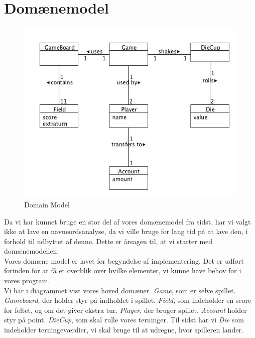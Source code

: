 \section{Domænemodel}
\begin{figure}[ht]
\centering
\includegraphics[scale=0.5]{DomainModelDieGame.jpg}
\caption[<Text for the list of figures>]{Domain Model}
\label{fig:figure 2}
\end{figure}
Da vi har kunnet bruge en stor del af vores domænemodel fra sidst, har vi valgt ikke at lave en navneordsanalyse, da vi ville bruge for lang tid på at lave den, i forhold til udbyttet af denne. Dette er årsagen til, at vi starter med domænemodellen.
\\

Vores domæne model er lavet før begyndelse af implementering. Det er udført forinden for at få et overblik over hvilke elementer, vi kunne have behov for i vores program. 
\\


Vi har i diagrammet vist vores hoved domæner. \textit{Game}, som er selve spillet. \textit{Gameboard}, der holder styr på indholdet i spillet. \textit{Field}, som indeholder en score for feltet, og om det giver ekstra tur. \textit{Player}, der bruger spillet. \textit{Account} holder styr på point. \textit{DieCup}, som skal rulle vores terninger. Til sidst har vi \textit{Die} som indeholder terningeværdier, vi skal bruge til at udregne, hvor spilleren lander.